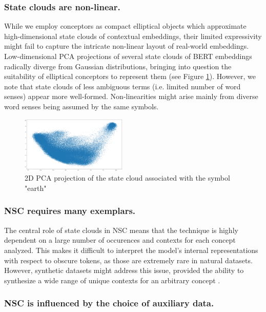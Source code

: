 \subsubsection{State clouds are non-linear.}

While we employ conceptors as compact elliptical objects which approximate high-dimensional state clouds of contextual embeddings, their limited expressivity might fail to capture the intricate non-linear layout of real-world embeddings. Low-dimensional PCA projections of several state clouds of BERT embeddings radically diverge from Gaussian distributions, bringing into question the suitability of elliptical conceptors to represent them (see Figure \ref{fig:earth}). However, we note that state clouds of less ambiguous terms (i.e. limited number of word senses) appear more well-formed. Non-linearities might arise mainly from diverse word senses being assumed by the same symbols.

\begin{figure}[h]
    \centering
    \includegraphics[width=0.45\textwidth]{img/earth.png}
    \caption{2D PCA projection of the state cloud associated with the symbol "earth"}\label{fig:earth}
\end{figure}

\subsubsection{NSC requires many exemplars.}

The central role of state clouds in NSC means that the technique is highly dependent on a large number of occurences and contexts for each concept analyzed. This makes it difficult to interpret the model's internal representations with respect to obscure tokens, as those are extremely rare in natural datasets. However, synthetic datasets might address this issue, provided the ability to synthesize a wide range of unique contexts for an arbitrary concept \citep{west_symbolic_2021}.

\subsubsection{NSC is influenced by the choice of auxiliary data.}


